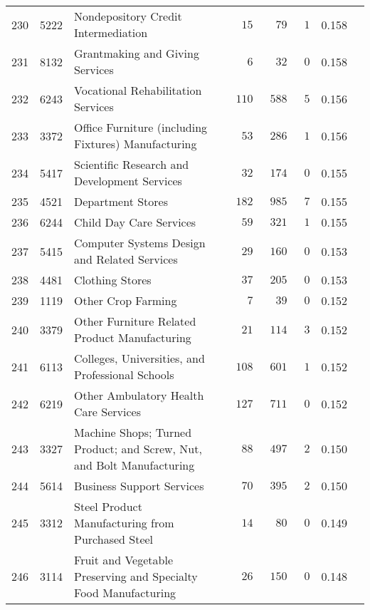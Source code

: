 \documentclass[9pt, oneside]{article}   	%
\begin{document}
\begin{longtable}{lcp{3 in}ccccc}
230  & 5222 & Nondepository Credit Intermediation & $\phantom{00}15$ & $\phantom{00}79$ & $\phantom{0}1$ & 0.158 \\
231  & 8132 & Grantmaking and Giving Services & $\phantom{000}6$ & $\phantom{00}32$ & $\phantom{0}0$ & 0.158 \\
232  & 6243 & Vocational Rehabilitation Services & $\phantom{0}110$ & $\phantom{0}588$ & $\phantom{0}5$ & 0.156 \\
233  & 3372 & Office Furniture (including Fixtures) Manufacturing & $\phantom{00}53$ & $\phantom{0}286$ & $\phantom{0}1$ & 0.156 \\
234  & 5417 & Scientific Research and Development Services & $\phantom{00}32$ & $\phantom{0}174$ & $\phantom{0}0$ & 0.155 \\
235  & 4521 & Department Stores & $\phantom{0}182$ & $\phantom{0}985$ & $\phantom{0}7$ & 0.155 \\
236  & 6244 & Child Day Care Services & $\phantom{00}59$ & $\phantom{0}321$ & $\phantom{0}1$ & 0.155 \\
237  & 5415 & Computer Systems Design and Related Services & $\phantom{00}29$ & $\phantom{0}160$ & $\phantom{0}0$ & 0.153 \\
238  & 4481 & Clothing Stores & $\phantom{00}37$ & $\phantom{0}205$ & $\phantom{0}0$ & 0.153 \\
239  & 1119 & Other Crop Farming & $\phantom{000}7$ & $\phantom{00}39$ & $\phantom{0}0$ & 0.152 \\
240  & 3379 & Other Furniture Related Product Manufacturing & $\phantom{00}21$ & $\phantom{0}114$ & $\phantom{0}3$ & 0.152 \\
241  & 6113 & Colleges, Universities, and Professional Schools & $\phantom{0}108$ & $\phantom{0}601$ & $\phantom{0}1$ & 0.152 \\
242  & 6219 & Other Ambulatory Health Care Services & $\phantom{0}127$ & $\phantom{0}711$ & $\phantom{0}0$ & 0.152 \\
243  & 3327 & Machine Shops; Turned Product; and Screw, Nut, and Bolt Manufacturing & $\phantom{00}88$ & $\phantom{0}497$ & $\phantom{0}2$ & 0.150 \\
244  & 5614 & Business Support Services & $\phantom{00}70$ & $\phantom{0}395$ & $\phantom{0}2$ & 0.150 \\
245  & 3312 & Steel Product Manufacturing from Purchased Steel & $\phantom{00}14$ & $\phantom{00}80$ & $\phantom{0}0$ & 0.149 \\
246  & 3114 & Fruit and Vegetable Preserving and Specialty Food Manufacturing & $\phantom{00}26$ & $\phantom{0}150$ & $\phantom{0}0$ & 0.148 \\

\end{longtable}
\end{document}
